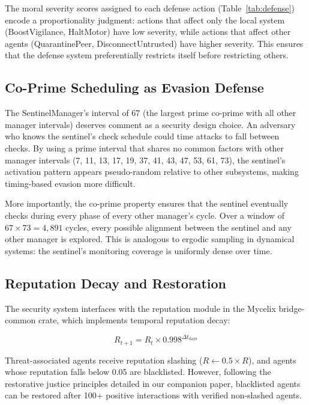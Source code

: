 \documentclass[11pt,a4paper]{article}
\begin{document}
The moral severity scores assigned to each defense action (Table~\ref{tab:defense}) encode a proportionality judgment: actions that affect only the local system (BoostVigilance, HaltMotor) have low severity, while actions that affect other agents (QuarantinePeer, DisconnectUntrusted) have higher severity. This ensures that the defense system preferentially restricts itself before restricting others.

\subsection{Co-Prime Scheduling as Evasion Defense}

The SentinelManager's interval of 67 (the largest prime co-prime with all other manager intervals) deserves comment as a security design choice. An adversary who knows the sentinel's check schedule could time attacks to fall between checks. By using a prime interval that shares no common factors with other manager intervals (7, 11, 13, 17, 19, 37, 41, 43, 47, 53, 61, 73), the sentinel's activation pattern appears pseudo-random relative to other subsystems, making timing-based evasion more difficult.

More importantly, the co-prime property ensures that the sentinel eventually checks during every phase of every other manager's cycle. Over a window of $67 \times 73 = 4{,}891$ cycles, every possible alignment between the sentinel and any other manager is explored. This is analogous to ergodic sampling in dynamical systems: the sentinel's monitoring coverage is uniformly dense over time.

\subsection{Reputation Decay and Restoration}

The security system interfaces with the reputation module in the Mycelix bridge-common crate, which implements temporal reputation decay:

\begin{equation}
R_{t+1} = R_t \times 0.998^{\Delta t_{\text{days}}}
\end{equation}

Threat-associated agents receive reputation slashing ($R \leftarrow 0.5 \times R$), and agents whose reputation falls below 0.05 are blacklisted. However, following the restorative justice principles detailed in our companion paper, blacklisted agents can be restored after 100+ positive interactions with verified non-slashed agents.
\end{document}
